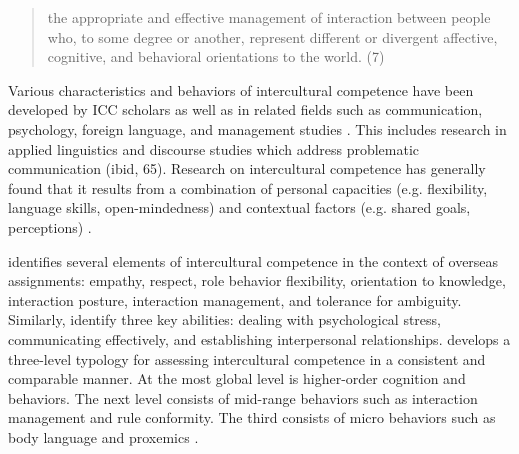 \begin{quote}
 the appropriate and effective management of interaction between people who, to some degree or another, represent different or divergent affective, cognitive, and behavioral orientations to the world. (7)   
\end{quote}


Various characteristics and behaviors of intercultural competence have been developed by ICC scholars as well as in related fields such as communication, psychology, foreign language, and management studies \cite[53-78]{Spencer-Oatey2009}. This includes research in applied linguistics and discourse studies which address problematic communication (ibid, 65). Research on intercultural competence has generally found that it results from a combination of personal capacities (e.g. flexibility, language skills, open-mindedness) and contextual factors (e.g. shared goals, perceptions) \citep{Arasaratnam}. 

\cite{Ruben1976} identifies several elements of intercultural competence in the context of overseas assignments: empathy, respect, role behavior flexibility, orientation to knowledge, interaction posture, interaction management, and tolerance for ambiguity. Similarly, \cite{Hammer1978} identify three key abilities: dealing with psychological stress, communicating effectively, and establishing interpersonal relationships. \cite{Martin1993} develops a three-level typology for assessing intercultural competence in a consistent and comparable manner. At the most global level is higher-order cognition and behaviors. The next level consists of mid-range behaviors such as interaction management and rule conformity. The third consists of micro behaviors such as body language and proxemics \citep[see][210-11 for an overview]{Wiseman2001}. 

